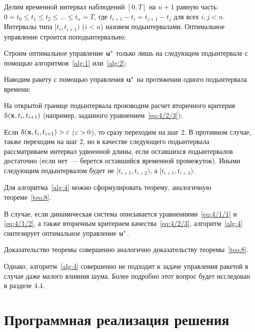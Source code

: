     \benum
        \item
            Делим временной интервал наблюдений $[0, T]$ на $n+1$ равную часть: $0 = t_0 \leqslant t_1 \leqslant t_2 \leqslant \ldots \leqslant t_{n} = T$, где $t_{i+1}-t_i = t_{j+1}-t_j$ для всех $i, j < n$. Интервалы типа $[t_i, t_{i+1})$ ($i<n$) назовем подынтервалами. Оптимальное управление строится поподынтервально;

        \item
            Строим оптимальное управление $\mathbf{u}^{*}$ только лишь на следующем подынтервале с помощью алгоритмов~\ref{alg:1} или~\vref{alg:2};

        \item
            Наводим ракету с помощью управления $\mathbf{u}^{*}$ на протяжении одного подынтервала времени;

        \item
            На открытой границе подынтервала производим расчет вторичного критерия $\mathcal{S}(\mathbf{x}, t_i, t_{i+1})$ (например, заданного уравнением~\ref{eq:4/2/3});

        \item
            Если $\mathcal{S}(\mathbf{x}, t_i, t_{i+1}) > \varepsilon$ ($\varepsilon > 0$), то сразу переходим на шаг 2. В противном случае, также переходим на шаг 2, но в качестве следующего подынтервала рассматриваем интервал удвоенной длины, если оставшихся подынтервалов достаточно (если нет~--- берется оставшийся временной промежуток). Иными следующим подынтервалом будет не $[t_{i+1}, t_{i+2})$, а $[t_{i+1}, t_{i+3})$.
    \eenum
\ealgo

Для алгоритма~\ref{alg:4} можно сформулировать теорему, аналогичную теореме~\ref{teo:8}.

    В случае, если динамическая система описывается уравнениями~\ref{eq:4/1/1} и \vref{eq:4/1/2}, а также вторичным критерием качества~\vref{eq:4/2/3}, алгоритм~\ref{alg:4} синтезирует оптимальное управление $\mathbf{u}^{*}$.
\eteo

Доказательство теоремы совершенно аналогично доказательству теоремы~\ref{teo:8}.

Однако, алгоритм~\ref{alg:4} совершенно не подходит к задаче управления ракетой в случае даже малого влияния шума. Более подробно этот вопрос будет исследован в разделе 4.4.



\section{Программная реализация решения}




